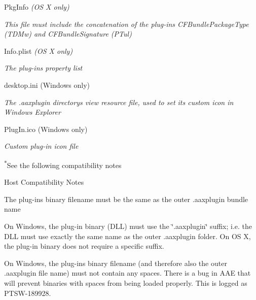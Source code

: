 \begin{DoxyItemize}
\begin{DoxyItemize}
\item Pkg\+Info {\itshape (O\+S X only) } 
\begin{DoxyItemize}
\item {\itshape This file must include the concatenation of the plug-\/in\textquotesingle{}s {\ttfamily C\+F\+Bundle\+Package\+Type} ({\ttfamily T\+D\+Mw}) and {\ttfamily C\+F\+Bundle\+Signature} ({\ttfamily P\+Tul})}  
\end{DoxyItemize}
\end{DoxyItemize}
\begin{DoxyItemize}
\item Info.\+plist {\itshape (O\+S X only) } 
\begin{DoxyItemize}
\item {\itshape The plug-\/in\textquotesingle{}s property list}  
\end{DoxyItemize}
\end{DoxyItemize}
\item desktop.\+ini (Windows only) 
\begin{DoxyItemize}
\item {\itshape The .aaxplugin directory\textquotesingle{}s view resource file, used to set its custom icon in Windows Explorer}  
\end{DoxyItemize}
\item Plug\+In.\+ico (Windows only) 
\begin{DoxyItemize}
\item {\itshape Custom plug-\/in icon file}  
\end{DoxyItemize}
\end{DoxyItemize}

\textsuperscript{$\ast$}See the following compatibility notes \begin{DoxyRefDesc}{Host Compatibility Notes}
\item[\hyperlink{a00380__compatibility_notes000003}{Host Compatibility Notes}]\begin{DoxyItemize}
\item The plug-\/in\textquotesingle{}s binary filename must be the same as the outer .aaxplugin bundle name \end{DoxyItemize}
\begin{DoxyItemize}
\item On Windows, the plug-\/in binary (D\+L\+L) must use the \char`\"{}.\+aaxplugin\char`\"{} suffix; i.\+e. the D\+L\+L must use exactly the same name as the outer .aaxplugin folder. On O\+S X, the plug-\/in binary does not require a specific suffix. \end{DoxyItemize}
\begin{DoxyItemize}
\item On Windows, the plug-\/in\textquotesingle{}s binary filename (and therefore also the outer .aaxplugin file name) must not contain any spaces. There is a bug in A\+A\+E that will prevent binaries with spaces from being loaded properly. This is logged as P\+T\+S\+W-\/189928.\end{DoxyItemize}
\end{DoxyRefDesc}


